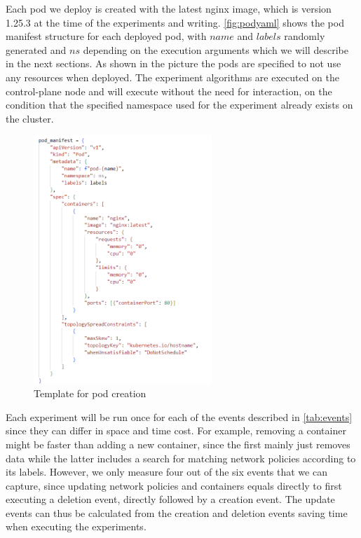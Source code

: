 Each pod we deploy is created with the latest nginx image, which is version 1.25.3 at the time of the experiments and writing. \autoref{fig:podyaml} shows the pod manifest structure for each deployed pod, with $name$ and $labels$ randomly generated and $ns$ depending on the execution arguments which we will describe in the next sections. As shown in the picture the pods are specified to not use any resources when deployed. The experiment algorithms are executed on the control-plane node and will execute without the need for interaction, on the condition that the specified namespace used for the experiment already exists on the cluster.
\\[10pt]
\begin{figure}[htbp]
  \centering
  \includegraphics[width=0.6\textwidth]{images/podyaml.png} 
  \caption{Template for pod creation}
  \label{fig:podyaml}
\end{figure}

Each experiment will be run once for each of the events described in \autoref{tab:events} since they can differ in space and time cost. For example, removing a container might be faster than adding a new container, since the first mainly just removes data while the latter includes a search for matching network policies according to its labels. However, we only measure four out of the six events that we can capture, since updating network policies and containers equals directly to first executing a deletion event, directly followed by a creation event. The update events can thus be calculated from the creation and deletion events saving time when executing the experiments.
\\[10pt]

